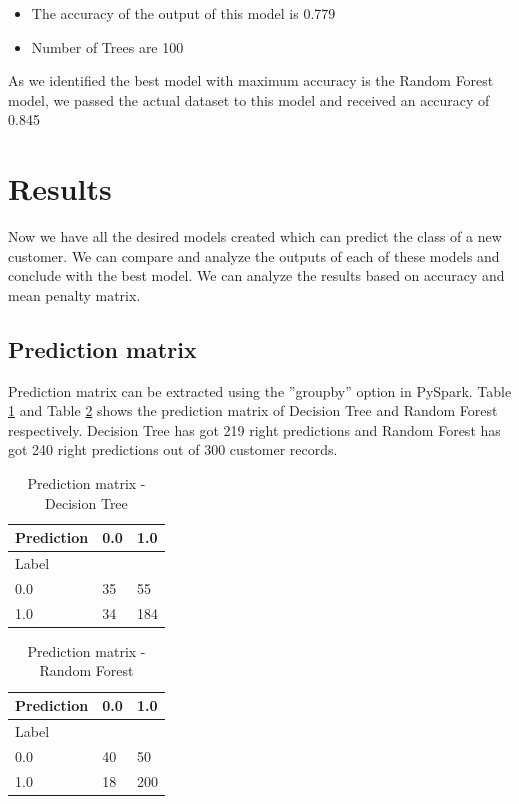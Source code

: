 \documentclass[sigconf]{acmart}
\begin{document}
\begin{itemize}
   \item The accuracy of the output of this model is 0.779
   \item Number of Trees are 100
\end{itemize}

As we identified the best model with maximum accuracy is the Random Forest model, we passed the actual dataset to this model and received an accuracy of 0.845

\section{Results}

Now we have all the desired models created which can predict the class of a new customer. We can compare and analyze the outputs of each of these models and conclude with the best model. We can analyze the results based on accuracy and mean penalty matrix.

\subsection{Prediction matrix} 

Prediction matrix can be extracted using the ''groupby'' option in PySpark. Table \ref{tab:table10} and Table \ref{tab:table11} shows the prediction matrix of Decision Tree and Random Forest respectively. Decision Tree has got 219 right predictions and Random Forest has got 240 right predictions out of 300 customer records.


\begin{table}[]
  \centering
  \caption{Prediction matrix - Decision Tree}
  \label{tab:table10}
  \begin{tabular}{|l|l|l|}
    \hline
    \multicolumn{1}{|c|}{Prediction} & 0.0       & 1.0       \\ \hline
    Label                            & \multicolumn{2}{l|}{} \\ \hline
    0.0                              & 35        & 55        \\ \hline
    1.0                              & 34        & 184       \\ \hline
  \end{tabular}
\end{table}

\begin{table}[]
  \centering
  \caption{Prediction matrix - Random Forest}
  \label{tab:table11}
  \begin{tabular}{|l|l|l|}
    \hline
    \multicolumn{1}{|c|}{Prediction} & 0.0       & 1.0       \\ \hline
    Label                            & \multicolumn{2}{l|}{} \\ \hline
    0.0                              & 40        & 50        \\ \hline
    1.0                              & 18        & 200       \\ \hline
  \end{tabular}
\end{table}
\end{document}
